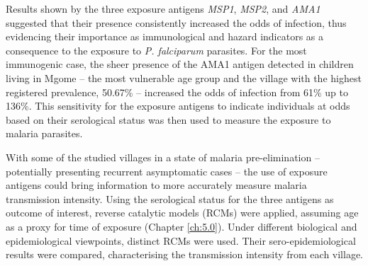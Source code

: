 Results shown by the three exposure antigens \textit{MSP1}, \textit{MSP2}, and \textit{AMA1} suggested that their presence consistently increased the odds of infection, thus evidencing their importance as immunological and hazard indicators as a consequence to the exposure to \textit{P. falciparum} parasites.
For the most immunogenic case, the sheer presence of the AMA1 antigen detected in children living in Mgome -- the most vulnerable age group and the village with the highest registered prevalence, 50.67\% -- increased the odds of infection from 61\% up to 136\%.
This sensitivity for the exposure antigens to indicate individuals at odds based on their serological status was then used to measure the exposure to malaria parasites.

With some of the studied villages in a state of malaria pre-elimination -- potentially presenting recurrent asymptomatic cases -- the use of exposure antigens could bring information to more accurately measure malaria transmission intensity.
Using the serological status for the three antigens as outcome of interest, reverse catalytic models (RCMs) were applied, assuming age as a proxy for time of exposure (Chapter \ref{ch:5.0}).
Under different biological and epidemiological viewpoints, distinct RCMs were used.
Their sero-epidemiological results were compared, characterising the transmission intensity from each village.
